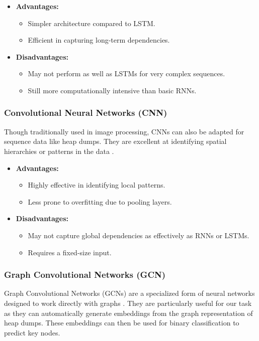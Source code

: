     \begin{itemize}
        \item \textbf{Advantages:}
        \begin{itemize}
            \item Simpler architecture compared to LSTM.
            \item Efficient in capturing long-term dependencies.
        \end{itemize}
        \item \textbf{Disadvantages:}
        \begin{itemize}
            \item May not perform as well as LSTMs for very complex sequences.
            \item Still more computationally intensive than basic RNNs.
        \end{itemize}
    \end{itemize}

    \subsubsection{Convolutional Neural Networks (CNN)}
    Though traditionally used in image processing, CNNs can also be adapted for sequence data like heap dumps. They are excellent at identifying spatial hierarchies or patterns in the data \cite{DeepLearningBook16} \cite{lecun_gradient_based_1998}.

    \begin{itemize}
        \item \textbf{Advantages:}
        \begin{itemize}
            \item Highly effective in identifying local patterns.
            \item Less prone to overfitting due to pooling layers.
        \end{itemize}
        \item \textbf{Disadvantages:}
        \begin{itemize}
            \item May not capture global dependencies as effectively as RNNs or LSTMs.
            \item Requires a fixed-size input.
        \end{itemize}
    \end{itemize}

    \subsubsection{Graph Convolutional Networks (GCN)}
    Graph Convolutional Networks (GCNs) are a specialized form of neural networks designed to work directly with graphs \cite{KG22}. They are particularly useful for our task as they can automatically generate embeddings from the graph representation of heap dumps. These embeddings can then be used for binary classification to predict key nodes.

